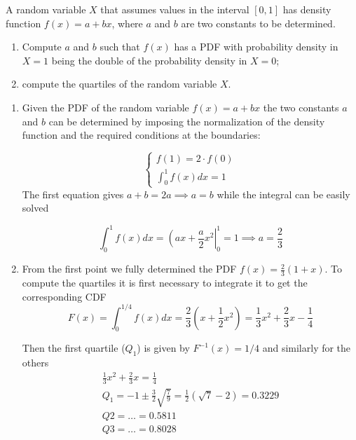 
\begin{question}
A random variable $X$ that assumes values in the interval $[0, 1]$ has density function $f(x) = a + b x$,
where $a$ and $b$ are two constants to be determined.

\begin{enumerate}[label={\emph{\alph*})}]
\tightlist
\item Compute $a$ and $b$ such that $f(x)$ has a PDF with probability density in $X = 1$ being the double of the probability density in $X = 0$;
\item compute the quartiles of the random variable $X$.
\end{enumerate}
\end{question}

\begin{solution}
\begin{enumerate}[label={\emph{\alph*})}]
\tightlist
\item Given the PDF of the random variable $f(x) = a + bx$ the two constants $a$ and $b$ can be determined by imposing the normalization of the density function and the required conditions at the boundaries:

\begin{equation*}
\begin{cases}
	f(1) = 2\cdot f(0)\\
	\int_0^1 f(x)dx = 1
\end{cases}  
\end{equation*}
The first equation gives $a+b = 2a \implies a = b$ while the integral can be easily solved

\begin{equation*}
\int_0^1 f(x)dx = \left(ax + \frac{a}{2}x^2\right|^1_0 = 1 \implies a = \frac{2}{3}
\end{equation*}

\item From the first point we fully determined the PDF $f(x) = \frac{2}{3}(1 + x)$. To compute the quartiles it is first necessary to integrate it to get the corresponding CDF 
\begin{equation*}
F(x) = \int_0^{1/4} f(x)dx = \frac{2}{3}\left(x + \frac{1}{2}x^2\right) = \frac{1}{3}x^2 + \frac{2}{3} x  - \frac{1}{4}
\end{equation*}

Then the first quartile ($Q_1$) is given by $F^{-1}(x) = 1/4$ and similarly for the others
\begin{gather*}
\frac{1}{3}x^2 + \frac{2}{3} x  = \frac{1}{4} \\
Q_1 = -1 \pm \frac{3}{2}\sqrt{\frac{7}{9}} = \frac{1}{2}(\sqrt{7} - 2) = 0.3229\\
Q2 = \dots = 0.5811\\
Q3 = \dots = 0.8028
\end{gather*}
\end{enumerate}
\end{solution}



